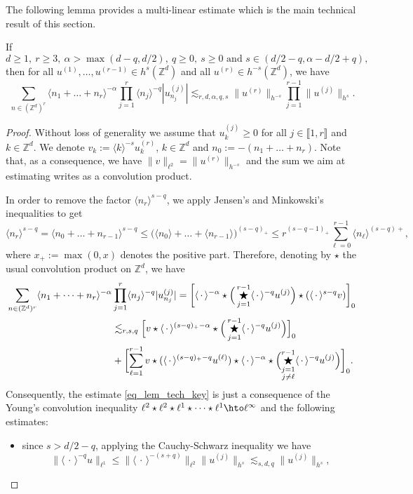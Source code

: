 The following lemma provides a multi-linear estimate which is the main technical result of this section.
\begin{lemma} \label{lem_tech_key} If
\[
d\geq 1,\ r\geq 3,\ \alpha >\max(d-q,d/2),\ q\geq 0,\ s\geq 0\text{ and }s \in (d/2-q, \alpha-d/2+q),
\]
then for all $u^{(1)},\dots, u^{(r-1)} \in h^s(\mathbb{Z}^d)$ and all $u^{(r)} \in h^{-s}(\mathbb{Z}^d)$, we have
\begin{equation}
\label{eq_lem_tech_key}
\sum_{n\in (\mathbb{Z}^d)^r} \langle n_1 + \dots + n_r \rangle^{-\alpha} \prod_{j=1}^r \langle n_j \rangle^{-q} |u^{(j)}_{n_j}| \lesssim_{r,d,\alpha,q,s} \| u^{(r)} \|_{h^{-s}} \prod_{j=1}^{r-1}\| u^{(j)} \|_{h^{s}}.
\end{equation}
\end{lemma}
\begin{proof}Without loss of generality we assume that $u^{(j)}_k \geq 0$ for all $j\in \llbracket 1,r \rrbracket$ and $k\in \mathbb{Z}^d$. We denote $v_k:= \langle k\rangle^{-s} u^{(r)}_k$, $k\in \mathbb{Z}^d$ and $n_{0}:= -(n_1+\dots+n_r)$. Note that, as a consequence, we have $\|v\|_{\ell^2} = \| u^{(r)}\|_{h^{-s}}$ and the sum we aim at estimating writes as a convolution product.

In order to remove the factor $\langle n_r \rangle^{s-q}$, we apply Jensen's and Minkowski's inequalities to get
\[
\langle n_r \rangle^{s-q} = \langle n_0 + \dots + n_{r-1} \rangle^{s-q} \leq \big(\langle n_0 \rangle+ \dots + \langle n_{r-1} \rangle \big) ^{(s-q)_+} \leq r^{(s-q-1)_+} \sum_{\ell =0}^{r-1} \langle n_{\ell} \rangle^{(s-q)+},
\]
where $x_+:= \max(0,x)$ denotes the positive part. Therefore, denoting by $\star$ the usual convolution product on $\mathbb{Z}^d$, we have
\begin{align*}
\sum_{n\in (\mathbb{Z}^d)^r} \langle n_1 + \dots + n_r \rangle^{-\alpha}& \prod_{j=1}^r \langle n_j \rangle^{-q} |u^{(j)}_{n_j}| = \biggl[\langle \, \cdot \, \rangle^{-\alpha} \star \Big(\mathop{\bigstar}_{j=1}^{r-1} \langle \, \cdot \, \rangle^{-q} u^{(j)} \Big) \star (\langle \, \cdot \, \rangle^{s-q} v)\biggr]_0 \\
&\lesssim_{r,s,q} \Bigl[v\star \langle \, \cdot \, \rangle^{(s-q)_+-\alpha} \star \Big(\mathop{\bigstar}_{j=1}^{r-1} \langle \, \cdot \, \rangle^{-q} u^{(j)} \Big)\Bigl]_0 \\
& + \biggl[\sum_{\ell=1}^{r-1} v\star (\langle \, \cdot\,\rangle^{(s-q)_+-q} u^{(\ell)}) \star \langle \, \cdot \, \rangle^{-\alpha} \star \Bigl(\mathop{\bigstar}_{\substack{j=1 \\ j\neq \ell}}^{r-1} \langle \, \cdot \, \rangle^{-q} u^{(j)} \Bigr) \biggr]_0.
\end{align*}
Consequently, the estimate \eqref{eq_lem_tech_key} is just a consequence of the Young's convolution inequality $\ell^2 \star \ell^2 \star \ell^1 \star \dots \star \ell^1 \hto \ell^\infty$ and the following estimates:
\begin{itemize}
\item
since $s > d/2-q$, applying the Cauchy-Schwarz inequality we have
\[
\| \langle \, \cdot \, \rangle^{-q} u \|_{\ell^1} \leq \| \langle \, \cdot \, \rangle^{-(s+q)} \|_{\ell^2} \| u^{(j)} \|_{h^s}\lesssim_{s,d,q}\| u^{(j)} \|_{h^s},
\]


\end{itemize}
\end{proof}
